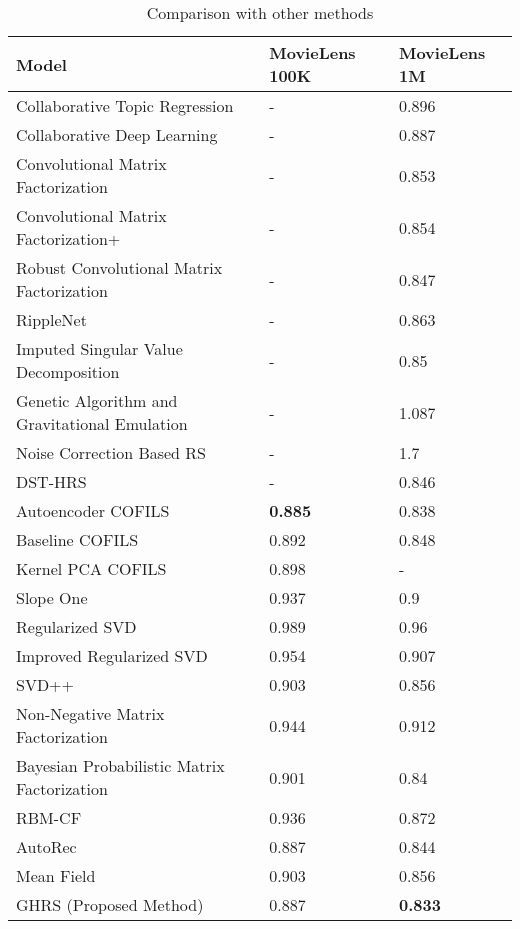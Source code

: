 \documentclass[a4paper,fleqn]{cas-dc}
\begin{document}
\begin{table*}[width=\textwidth,cols=3,pos=h]
	\centering
	\caption{Comparison with other methods}\label{TBL:04}
	\begin{tabular*}{\tblwidth}{lll}
		\toprule
		Model & MovieLens 100K & MovieLens 1M \\
		\midrule
		Collaborative Topic Regression \citep{70wang2011a} & - & 0.896 \\
		Collaborative Deep Learning \citep{34wang2015b} & - & 0.887 \\
		Convolutional Matrix Factorization \citep{72kim2016a} & - & 0.853 \\
		Convolutional Matrix Factorization+ \citep{72kim2016a} & - & 0.854 \\
		Robust Convolutional Matrix Factorization \citep{73kim2017a} & - & 0.847 \\
		RippleNet \citep{74wang2018a} & - & 0.863 \\
		Imputed Singular Value Decomposition \citep{75yuan2018a} & - & 0.85 \\
		Genetic Algorithm and Gravitational Emulation \citep{76mohammadpoura2019a} & -	 & 1.087 \\
		Noise Correction Based RS \citep{77bag2019a} & - & 1.7 \\
		DST-HRS \citep{78khan2020a} & - & 0.846 \\
		Autoencoder COFILS \citep{85barbieri2017autoencoders} & \textbf{0.885} & 0.838 \\
		Baseline COFILS \citep{85barbieri2017autoencoders} & 0.892 & 0.848 \\
		Kernel PCA COFILS \citep{85barbieri2017autoencoders} & 0.898 & - \\
		Slope One \citep{79lemire2005slope} & 0.937 & 0.9 \\
		Regularized SVD \citep{80paterek2007improving} & 0.989 & 0.96 \\
		Improved Regularized SVD \citep{80paterek2007improving} & 0.954 & 0.907 \\
		SVD++ \citep{81koren2008factorization} & 0.903 & 0.856 \\
		Non-Negative Matrix Factorization \citep{82lee2001algorithms} & 0.944 & 0.912 \\
		Bayesian Probabilistic Matrix Factorization \citep{15salakhutdinov2008a} & 0.901 & 0.84 \\
		RBM-CF \citep{83salakhutdinov2007restricted} & 0.936 & 0.872 \\
		AutoRec \citep{25sedhain2015a} & 0.887 & 0.844 \\
		Mean Field \citep{84langseth2015scalable} & 0.903 & 0.856 \\
		GHRS (Proposed Method) & 0.887 & \textbf{0.833} \\
		\bottomrule
	\end{tabular*}
\end{table*}
\end{document}
